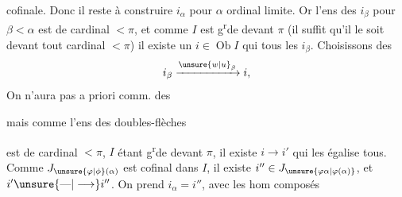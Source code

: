 
cofinale. Donc il reste à  construire
$i_\alpha$ pour $\alpha$ ordinal limite. Or
l'ens des $i_\beta$ pour $\beta<\alpha$ est de
cardinal $<\pi$, et comme  $I$ est g\textsuperscript{r}de
devant $\pi$ (il suffit qu'il le soit devant
tout cardinal $<\pi$) il existe un
$i\in\operatorname{Ob}I$ qui  tous les $i_\beta$.
Choisissons des
\[
i_\beta\xrightarrow{\unsure{w|u}_\beta}i,
\]
On n'aura pas a priori comm. des


mais comme l'ens des doubles-flèches


est de cardinal $<\pi$, $I$ étant g\textsuperscript{r}de devant $\pi$,
il existe $i\longrightarrow i'$ qui les égalise
tous. Comme $J_{\unsure{\varphi|\phi}(\alpha)}$ est cofinal dans
$I$, il existe $i''\in J_{\unsure{\varphi\alpha|\varphi(\alpha)}}$, et $i'\unsure{\text{---}|\longrightarrow}i''$.
On prend $i_\alpha=i''$, avec les hom composés

